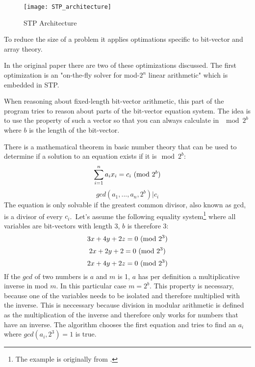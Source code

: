 \begin{figure}[h]
\texttt{[image: STP\_architecture]}
\caption{STP Architecture}
\label{fig:STP_architecture}
\end{figure}


To reduce the size of a problem it applies optimations specific to bit-vector and array theory.

In the original paper \cite{Ganesh:2007:DPB:1770351.1770421} there are two of these optimizations discussed. The first optimization is an "on-the-fly solver for mod-$2^n$ linear arithmetic" which is embedded in STP. 

When reasoning about fixed-length bit-vector arithmetic, this part of the program tries to reason about parts of the bit-vector equation system.
The idea is to use the property of such a vector so that you can always calculate in $\mod{2^b}$ where $b$ is the length of the bit-vector.

There is a mathematical theorem in basic number theory that can be used to determine if a solution to an equation exists if it is$\mod{2^b}$:
$$\sum_{i=1}^{n} a_ix_i = c_i  \ (\mathrm{mod}\ 2^b)$$
$$gcd(a_1,...,a_n,2^b) | c_i$$
The equation is only solvable if the greatest common divisor, also known as gcd, is a divisor of every $c_i$.\
Let's assume the following equality system\footnote{The example is originally from \cite{Ganesh:2007:DPB:1770351.1770421}.} where all variables are bit-vectors with length 3, $b$ is therefore 3:
\todo{replace system with own example}
$$3x+4y+2z=0 \ (\mathrm{mod}\ 2^3)$$
$$2x+2y+2=0  \ (\mathrm{mod}\ 2^3)$$
$$2x+4y+2z=0 \ (\mathrm{mod}\ 2^3)$$
If the $gcd$ of two numbers is $a$ and $m$ is 1, $a$ has per definition a multiplicative inverse in mod $m$. In this particular case $m=2^b$. This property is necessary, because one of the variables needs to be isolated and therefore multiplied with the inverse. This is neccessary because division in modular arithmetic is defined as the multiplication of the inverse and therefore only works for numbers that have an inverse.
The algorithm chooses the first equation and tries to find an $a_i$ where $gcd(a_i,2^3) = 1$ is true.

